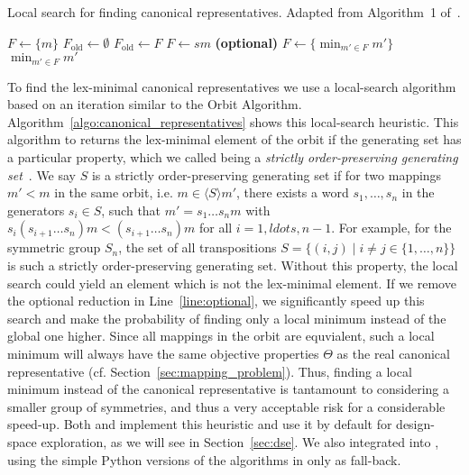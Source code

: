 \begin{algorithm}
   \caption{Local search for finding canonical representatives. Adapted from Algorithm~1 of~\cite{goens_mcsoc18}.}
   \label{algo:canonical_representatives}
   \begin{algorithmic}[1]
     \State $F \gets \{m\}$
     \State $F_\text{old} \gets \emptyset$
     \State $F_\text{old} \gets F$
     \State $F \gets sm$
     \EndIf
     \EndFor
     \EndFor
     \State \label{line:optional} \textbf{(optional)} $F \gets \{ \operatorname{min}_{ m' \in F} m' \}$
     \EndWhile
     \Return $\operatorname{min}_{ m' \in F} m'$
   \end{algorithmic}
 \end{algorithm}
 
To find the lex-minimal canonical representatives we use a local-search algorithm based on an iteration similar to the Orbit Algorithm. 
Algorithm~\ref{algo:canonical_representatives} shows this local-search heuristic. 
This algorithm to returns the lex-minimal element of the orbit if the generating set has a particular property, which we called being a \emph{strictly order-preserving generating set}~\cite{goens_mcsoc18}.
We say $S$ is a strictly order-preserving generating set if for two mappings $m' < m$ in the same orbit, i.e. $m \in \langle S \rangle m'$, there exists a word $s_1,\ldots,s_n$ in the generators $s_i \in S$, such that $m' = s_1 \ldots s_n m$ with $s_i (s_{i+1}\ldots s_n)m < (s_{i+1} \ldots s_n)m$ for all $i = 1,ldots,n-1$.
For example, for the symmetric group $S_n$, the set of all transpositions $S = \{ (i,j) \mid i \neq j \in \{1,\ldots,n\} \}$ is such a strictly order-preserving generating set.
Without this property, the local search could yield an element which is not the lex-minimal element.
If we remove the optional reduction in Line~\ref{line:optional}, we significantly speed up this search and make the probability of finding only a local minimum instead of the global one higher.
Since all mappings in the orbit are equvialent, such a local minimum will always have the same objective properties $\Theta$ as the real canonical representative (cf. Section~\ref{sec:mapping_problem}).
Thus, finding a local minimum instead of the canonical representative is tantamount to considering a smaller group of symmetries, and thus a very acceptable risk for a considerable speed-up.
Both \mpsym and \mocasin implement this heuristic and use it by default for design-space exploration, as we will see in Section~\ref{sec:dse}. 
We also integrated \mpsym into \mocasin , using the simple Python versions of the algorithms in \mocasin only as fall-back. 

